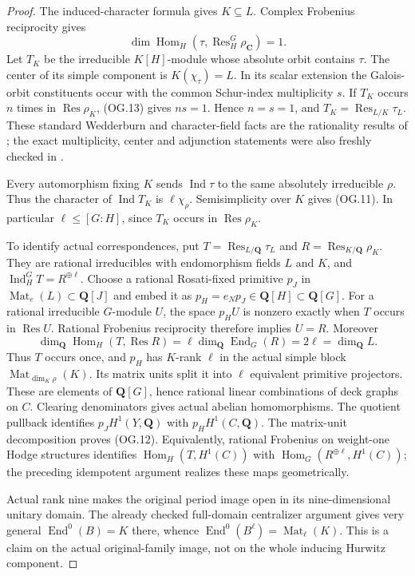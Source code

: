 \begin{proof}
The induced-character formula gives $K\subseteq L$.
Complex Frobenius reciprocity gives
\[
 \dim\operatorname{Hom}_H
       (\tau,\operatorname{Res}_H^G\rho_{\mathbf C})=1.
 \tag{OG.13}
\]
Let $T_K$ be the irreducible $K[H]$-module whose absolute orbit
contains $\tau$.  The center of its simple component is
$K(\chi_\tau)=L$.  In its scalar extension the Galois-orbit
constituents occur with the common Schur-index multiplicity $s$.
If $T_K$ occurs $n$ times in $\operatorname{Res}\rho_K$, (OG.13)
gives $ns=1$.  Hence $n=s=1$, and
$T_K=\operatorname{Res}_{L/K}\tau_L$.
These standard Wedderburn and character-field facts are the
rationality results of \cite[Section 12.2]{OG:Serre1977};
the exact multiplicity, center and adjunction statements were
also freshly checked in
\cite[Propositions 4.3.2, 4.6.14 and 4.4.2]{OG:Zheng2025}.

Every automorphism fixing $K$ sends $\operatorname{Ind}\tau$
to the same absolutely irreducible $\rho$.  Thus the character
of $\operatorname{Ind}T_K$ is $\ell\chi_\rho$.
Semisimplicity over $K$ gives (OG.11).
In particular $\ell\le[G:H]$, since $T_K$ occurs in
$\operatorname{Res}\rho_K$.

To identify actual correspondences, put
$T=\operatorname{Res}_{L/\mathbf Q}\tau_L$ and
$R=\operatorname{Res}_{K/\mathbf Q}\rho_K$.
They are rational irreducibles with endomorphism fields
$L$ and $K$, and
$\operatorname{Ind}_H^G T=R^{\oplus\ell}$.
Choose a rational Rosati-fixed primitive $p_J$ in
$\operatorname{Mat}_e(L)\subset\mathbf Q[J]$ and embed it as
$p_H=e_Np_J\in\mathbf Q[H]\subset\mathbf Q[G]$.
For a rational irreducible $G$-module $U$, the space $p_HU$
is nonzero exactly when $T$ occurs in $\operatorname{Res}U$.
Rational Frobenius reciprocity therefore implies $U=R$.
Moreover
\[
 \dim_{\mathbf Q}\operatorname{Hom}_H(T,\operatorname{Res}R)
       =\ell\dim_{\mathbf Q}\operatorname{End}_G(R)
       =2\ell=\dim_{\mathbf Q}L.
 \tag{OG.14}
\]
Thus $T$ occurs once, and $p_H$ has $K$-rank $\ell$ in the
actual simple block $\operatorname{Mat}_{\dim_K\rho}(K)$.
Its matrix units split it into $\ell$ equivalent primitive
projectors.  These are elements of $\mathbf Q[G]$, hence
rational linear combinations of deck graphs on $C$.
Clearing denominators gives actual abelian homomorphisms.
The quotient pullback identifies
$p_JH^1(Y,\mathbf Q)$ with $p_HH^1(C,\mathbf Q)$.
The matrix-unit decomposition proves (OG.12).
Equivalently, rational Frobenius on weight-one Hodge structures
identifies
$\operatorname{Hom}_H(T,H^1(C))$ with
$\operatorname{Hom}_G(R^{\oplus\ell},H^1(C))$;
the preceding idempotent argument realizes these maps geometrically.

Actual rank nine makes the original period image open in its
nine-dimensional unitary domain.  The already checked
full-domain centralizer argument gives very general
$\operatorname{End}^0(B)=K$ there, whence
$\operatorname{End}^0(B^\ell)=\operatorname{Mat}_\ell(K)$.
This is a claim on the actual original-family image, not on
the whole inducing Hurwitz component.
\end{proof}

